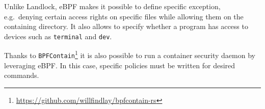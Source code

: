 Unlike Landlock, eBPF makes it possible to define specific exception, e.g.\ denying
certain access rights on specific files while allowing them on the containing directory.
It also allows to specify whether a program has access to devices such as \texttt{terminal}
and \texttt{dev}.

Thanks to \texttt{BPFContain}\footnote{\url{https://github.com/willfindlay/bpfcontain-rs}}
it is also possible to run a container security daemon by leveraging eBPF.  In this case,
specific policies must be written for desired commands.